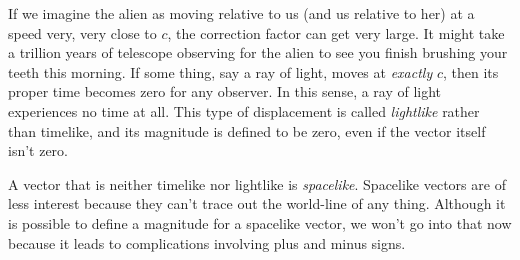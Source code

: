 If we imagine the alien as moving relative to us (and us relative to her) at a speed very, very close to $c$, the correction
factor can get very large. It might take a trillion years of telescope observing for the alien to see you finish
brushing your teeth this morning. If some thing, say a ray of light, moves at \emph{exactly} $c$, then its
proper time becomes zero for any observer. In this sense, a ray of light experiences no time at all.
This type of displacement is called \emph{lightlike} rather than timelike, and its magnitude is defined to be
zero, even if the vector itself isn't zero.


A vector that is neither timelike nor lightlike is \emph{spacelike}. Spacelike vectors are of
less interest because they can't trace out the world-line of any thing. Although it is possible to define a magnitude
for a spacelike vector, we won't go into that now because it leads to complications involving plus and minus signs.
